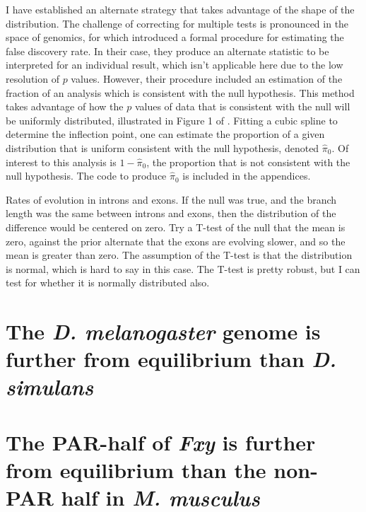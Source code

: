 I have established an alternate strategy that takes advantage of the shape of the distribution. The challenge of correcting for multiple tests is pronounced in the space of genomics, for which \cite{Storey2003StatisticalStudies} introduced a formal procedure for estimating the false discovery rate. In their case, they produce an alternate statistic to be interpreted for an individual result, which isn't applicable here due to the low resolution of $p$ values. However, their procedure included an estimation of the fraction of an analysis which is consistent with the null hypothesis. This method takes advantage of how the $p$ values of data that is consistent with the null will be uniformly distributed, illustrated in Figure 1 of \cite{Storey2003StatisticalStudies}. Fitting a cubic spline to determine the inflection point, one can estimate the proportion of a given distribution that is uniform consistent with the null hypothesis, denoted $\hat \pi_{0}$. Of interest to this analysis is $1 -\hat \pi_{0}$, the proportion that is not consistent with the null hypothesis. The code to produce $\hat \pi_{0}$ is included in the appendices. 

Rates of evolution in introns and exons. If the null was true, and the branch length was the same between introns and exons, then the distribution of the difference would be centered on zero. Try a T-test of the null that the mean is zero, against the prior alternate that the exons are evolving slower, and so the mean is greater than zero. The assumption of the T-test is that the distribution is normal, which is hard to say in this case. The T-test is pretty robust, but I can test for whether it is normally distributed also. 


\section{The \textit{D. melanogaster} genome is further from equilibrium than \textit{D. simulans}}





 
\section{The PAR-half of \textit{Fxy} is further from equilibrium than the non-PAR half in \textit{M. musculus}}